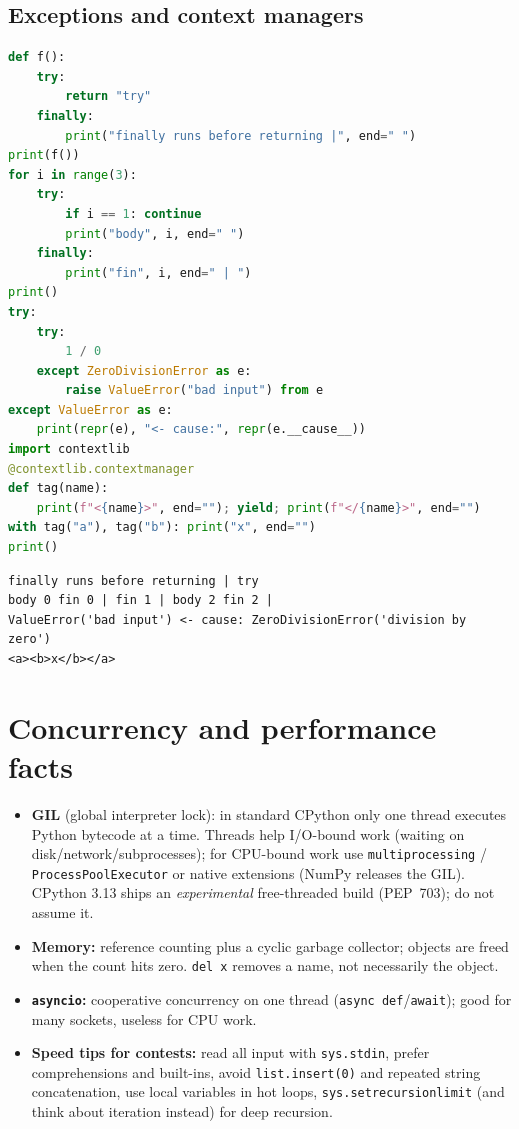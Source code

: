 \documentclass[10pt,a4paper,openany,oneside]{report}
\newcommand{\prio}[1]{\texorpdfstring{\ifcase#1\or{\color{gold}\ding{72}}\or{\color{gold}\ding{72}\ding{72}}\or{\color{gold}\ding{72}\ding{72}\ding{72}}\fi}{}}
\begin{document}
\subsection{Exceptions and context managers}
\begin{lstlisting}[language={Python}]
def f():
    try:
        return "try"
    finally:
        print("finally runs before returning |", end=" ")
print(f())
for i in range(3):
    try:
        if i == 1: continue
        print("body", i, end=" ")
    finally:
        print("fin", i, end=" | ")
print()
try:
    try:
        1 / 0
    except ZeroDivisionError as e:
        raise ValueError("bad input") from e
except ValueError as e:
    print(repr(e), "<- cause:", repr(e.__cause__))
import contextlib
@contextlib.contextmanager
def tag(name):
    print(f"<{name}>", end=""); yield; print(f"</{name}>", end="")
with tag("a"), tag("b"): print("x", end="")
print()
\end{lstlisting}
\begin{lstlisting}[style=out,title={Answer: captured output}]
finally runs before returning | try
body 0 fin 0 | fin 1 | body 2 fin 2 | 
ValueError('bad input') <- cause: ZeroDivisionError('division by zero')
<a><b>x</b></a>
\end{lstlisting}

\section{Concurrency and performance facts \prio{2}}
\begin{itemize}[nosep]
\item \textbf{GIL} (global interpreter lock): in standard CPython only one thread executes Python bytecode at a time. Threads help I/O-bound work (waiting on disk/network/subprocesses); for CPU-bound work use \texttt{multiprocessing} / \texttt{ProcessPoolExecutor} or native extensions (NumPy releases the GIL). CPython 3.13 ships an \emph{experimental} free-threaded build (PEP~703); do not assume it.
\item \textbf{Memory:} reference counting plus a cyclic garbage collector; objects are freed when the count hits zero. \texttt{del x} removes a name, not necessarily the object.
\item \textbf{\texttt{asyncio}:} cooperative concurrency on one thread (\texttt{async def}/\texttt{await}); good for many sockets, useless for CPU work.
\item \textbf{Speed tips for contests:} read all input with \texttt{sys.stdin}, prefer comprehensions and built-ins, avoid \texttt{list.insert(0)} and repeated string concatenation, use local variables in hot loops, \texttt{sys.setrecursionlimit} (and think about iteration instead) for deep recursion.
\end{itemize}
\end{document}

